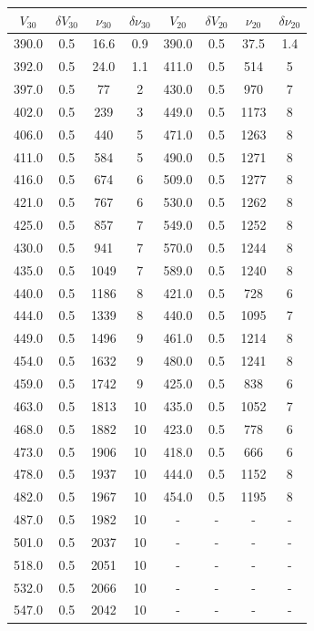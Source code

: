 \begin{table}[]
\centering \tiny
\begin{tabular}{cccc|cccc}
  $V_\text{30}$ & $\delta V_\text{30}$ & $\nu_\text{30}$ & $\delta \nu_\text{30}$ & $V_\text{20}$ & $\delta V_\text{20}$ & $\nu_\text{20}$ & $\delta \nu_\text{20}$ \\
\hline
390.0 & 0.5 & 16.6 & 0.9 & 390.0 & 0.5 & 37.5 & 1.4\\
392.0 & 0.5 & 24.0 & 1.1 & 411.0 & 0.5 & 514 & 5\\
397.0 & 0.5 & 77 & 2 & 430.0 & 0.5 & 970 & 7\\
402.0 & 0.5 & 239 & 3 & 449.0 & 0.5 & 1173 & 8\\
406.0 & 0.5 & 440 & 5 & 471.0 & 0.5 & 1263 & 8\\
411.0 & 0.5 & 584 & 5 & 490.0 & 0.5 & 1271 & 8\\
416.0 & 0.5 & 674 & 6 & 509.0 & 0.5 & 1277 & 8\\
421.0 & 0.5 & 767 & 6 & 530.0 & 0.5 & 1262 & 8\\
425.0 & 0.5 & 857 & 7 & 549.0 & 0.5 & 1252 & 8\\
430.0 & 0.5 & 941 & 7 & 570.0 & 0.5 & 1244 & 8\\
435.0 & 0.5 & 1049 & 7 & 589.0 & 0.5 & 1240 & 8\\
440.0 & 0.5 & 1186 & 8 & 421.0 & 0.5 & 728 & 6\\
444.0 & 0.5 & 1339 & 8 & 440.0 & 0.5 & 1095 & 7\\
449.0 & 0.5 & 1496 & 9 & 461.0 & 0.5 & 1214 & 8\\
454.0 & 0.5 & 1632 & 9 & 480.0 & 0.5 & 1241 & 8\\
459.0 & 0.5 & 1742 & 9 & 425.0 & 0.5 & 838 & 6\\
463.0 & 0.5 & 1813 & 10 & 435.0 & 0.5 & 1052 & 7\\
468.0 & 0.5 & 1882 & 10 & 423.0 & 0.5 & 778 & 6\\
473.0 & 0.5 & 1906 & 10 & 418.0 & 0.5 & 666 & 6\\
478.0 & 0.5 & 1937 & 10 & 444.0 & 0.5 & 1152 & 8\\
482.0 & 0.5 & 1967 & 10 & 454.0 & 0.5 & 1195 & 8\\
487.0 & 0.5 & 1982 & 10 & - & - & - & -\\
501.0 & 0.5 & 2037 & 10 & - & - & - & -\\
518.0 & 0.5 & 2051 & 10 & - & - & - & -\\
532.0 & 0.5 & 2066 & 10 & - & - & - & -\\
547.0 & 0.5 & 2042 & 10 & - & - & - & -\\

\end{tabular}
\end{table}
